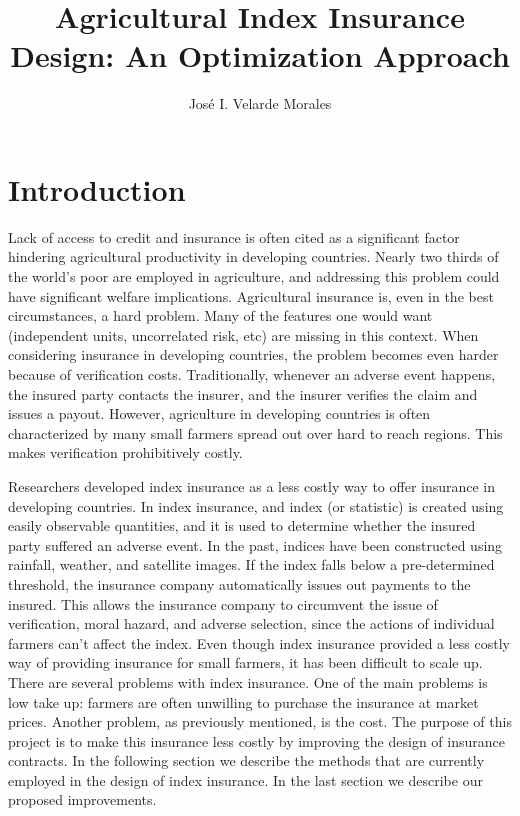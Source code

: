 \documentclass[11pt]{article}
\title{Agricultural Index Insurance Design: An Optimization Approach}
\author{José I. Velarde Morales}
\begin{document}
\maketitle

\section{Introduction}
Lack of access to credit and insurance is often cited as a significant factor hindering agricultural productivity in developing countries. Nearly two thirds of the world's poor are employed in agriculture, and addressing this problem could have significant welfare implications. Agricultural insurance is, even in the best circumstances, a hard problem. Many of the features one would want (independent units, uncorrelated risk, etc) are missing in this context. When considering insurance in developing countries, the problem becomes even harder because of verification costs. Traditionally, whenever an adverse event happens, the insured party contacts the insurer, and the insurer verifies the claim and issues a payout. However, agriculture in developing countries is often characterized by many small farmers spread out over hard to reach regions. This makes verification prohibitively costly. 

Researchers developed index insurance as a less costly way to offer insurance in developing countries. In index insurance, and index (or statistic) is created using easily observable quantities, and it is used to determine whether the insured party suffered an adverse event. In the past, indices have been constructed using rainfall, weather, and satellite images. If the index falls below a pre-determined threshold, the insurance company automatically issues out payments to the insured. This allows the insurance company to circumvent the issue of verification, moral hazard, and adverse selection, since the actions of individual farmers can't affect the index. Even though index insurance provided a less costly way of providing insurance for small farmers, it has been difficult to scale up. There are several problems with index insurance. One of the main problems is low take up: farmers are often unwilling to purchase the insurance at market prices. Another problem, as previously mentioned, is the cost. The purpose of this project is to make this insurance less costly by improving the design of insurance contracts. In the following section we describe the methods that are currently employed in the design of index insurance. In the last section we describe our proposed improvements. 
\end{document}
